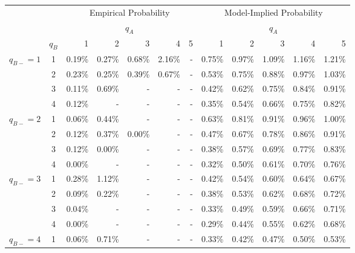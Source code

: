 \documentclass[11pt]{article}
\begin{document}
\begin{table}[!htbp]
         \centering
        \begin{adjustbox}{max width=\textwidth}
            \begin{tabular}{c c r r r r r |r r r r r}\toprule
             & &\multicolumn{5}{c}{Empirical Probability}& \multicolumn{5}{c}{Model-Implied Probability}  \\ \cmidrule{3-12}
              & &\multicolumn{5}{c}{$q_A$}& \multicolumn{5}{c}{$q_A$}  \\ \cmidrule{3-12}
             & $q_B$ & 1 & 2 & 3 & 4 & 5 & 1 & 2 & 3 & 4 & 5 \\ \midrule
             \multirow{4}{*}{$q_{B-}=1$}& 1 & 0.19\% & 0.27\% & 0.68\% & 2.16\% & - & 0.75\% & 0.97\% & 1.09\% & 1.16\% & 1.21\%  \\
             & 2 & 0.23\% & 0.25\% & 0.39\% & 0.67\% & - & 0.53\% & 0.75\% & 0.88\% & 0.97\% & 1.03\% \\
              & 3 & 0.11\% & 0.69\% & -     & -     & - & 0.42\% & 0.62\% & 0.75\% & 0.84\% & 0.91\%\\ 
             & 4 & 0.12\% & -     & -     & -     & - & 0.35\% & 0.54\% & 0.66\% & 0.75\% & 0.82\%  \\ \midrule
             \multirow{4}{*}{$q_{B-}=2$} & 1 & 0.06\% & 0.44\% & -     & -     & - & 0.63\% & 0.81\% & 0.91\% & 0.96\% & 1.00\% \\
             & 2 & 0.12\% & 0.37\% & 0.00\% & -     & - & 0.47\% & 0.67\% & 0.78\% & 0.86\% & 0.91\% \\
             & 3 & 0.12\% & 0.00\% & -     & -     & - & 0.38\% & 0.57\% & 0.69\% & 0.77\% & 0.83\% \\
             & 4 & 0.00\% & -     & -     & -     & - & 0.32\% & 0.50\% & 0.61\% & 0.70\% & 0.76\% \\\midrule
             \multirow{4}{*}{$q_{B-}=3$} & 1 & 0.28\% & 1.12\% & -     & -     & - & 0.42\% & 0.54\% & 0.60\% & 0.64\% & 0.67\% \\
             & 2 & 0.09\% & 0.22\% & -     & -     & - & 0.38\% & 0.53\% & 0.62\% & 0.68\% & 0.72\% \\
             & 3 & 0.04\% & -     & -     & -     & - & 0.33\% & 0.49\% & 0.59\% & 0.66\% & 0.71\% \\
             & 4 & 0.00\% & -     & -     & -     & - & 0.29\% & 0.44\% & 0.55\% & 0.62\% & 0.68\% \\\midrule
             \multirow{4}{*}{$q_{B-}=4$} & 1 & 0.06\% & 0.71\% & -     & -     & - & 0.33\% & 0.42\% & 0.47\% & 0.50\% & 0.53\% \\

\end{tabular}
\end{adjustbox}
\end{table}
\end{document}
